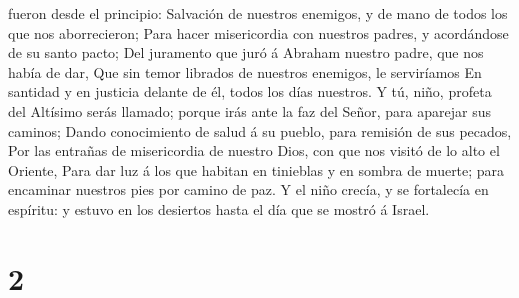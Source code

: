 fueron desde el principio:  Salvación de nuestros
enemigos, y de mano de todos los que nos aborrecieron; 
Para hacer misericordia con nuestros padres, y acordándose de su santo
pacto;  Del juramento que juró á Abraham nuestro padre,
que nos había de dar,  Que sin temor librados de nuestros
enemigos, le serviríamos  En santidad y en justicia
delante de él, todos los días nuestros.  Y tú, niño,
profeta del Altísimo serás llamado; porque irás ante la faz del Señor,
para aparejar sus caminos;  Dando conocimiento de salud á
su pueblo, para remisión de sus pecados,  Por las
entrañas de misericordia de nuestro Dios, con que nos visitó de lo alto
el Oriente,  Para dar luz á los que habitan en tinieblas
y en sombra de muerte; para encaminar nuestros pies por camino de paz.
 Y el niño crecía, y se fortalecía en espíritu: y estuvo
en los desiertos hasta el día que se mostró á Israel.

\hypertarget{section-1}{%
\section{2}\label{section-1}}

